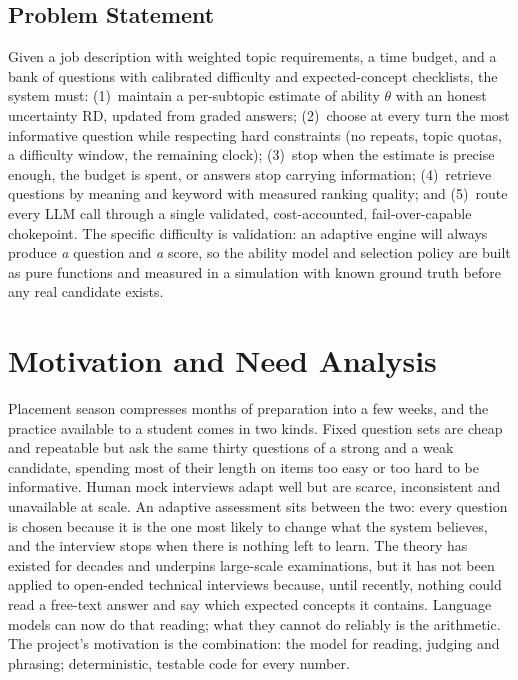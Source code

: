 \documentclass{tietreport}
\begin{document}
\subsection{Problem Statement}

Given a job description with weighted topic requirements, a time budget, and a bank of
questions with calibrated difficulty and expected-concept checklists, the system must:
(1)~maintain a per-subtopic estimate of ability $\theta$ with an honest uncertainty RD, updated
from graded answers; (2)~choose at every turn the most informative question while respecting
hard constraints (no repeats, topic quotas, a difficulty window, the remaining clock);
(3)~stop when the estimate is precise enough, the budget is spent, or answers stop carrying
information; (4)~retrieve questions by meaning and keyword with measured ranking quality; and
(5)~route every LLM call through a single validated, cost-accounted, fail-over-capable
chokepoint. The specific difficulty is validation: an adaptive engine will always produce
\emph{a} question and \emph{a} score, so the ability model and selection policy are built as
pure functions and measured in a simulation with known ground truth before any real candidate
exists.

\section{Motivation and Need Analysis}

Placement season compresses months of preparation into a few weeks, and the practice
available to a student comes in two kinds. Fixed question sets are cheap and repeatable but
ask the same thirty questions of a strong and a weak candidate, spending most of their length
on items too easy or too hard to be informative. Human mock interviews adapt well but are
scarce, inconsistent and unavailable at scale. An adaptive assessment sits between the two:
every question is chosen because it is the one most likely to change what the system believes,
and the interview stops when there is nothing left to learn. The theory has existed for
decades and underpins large-scale examinations, but it has not been applied to open-ended
technical interviews because, until recently, nothing could read a free-text answer and say
which expected concepts it contains. Language models can now do that reading; what they cannot
do reliably is the arithmetic. The project's motivation is the combination: the model for
reading, judging and phrasing; deterministic, testable code for every number.
\end{document}

